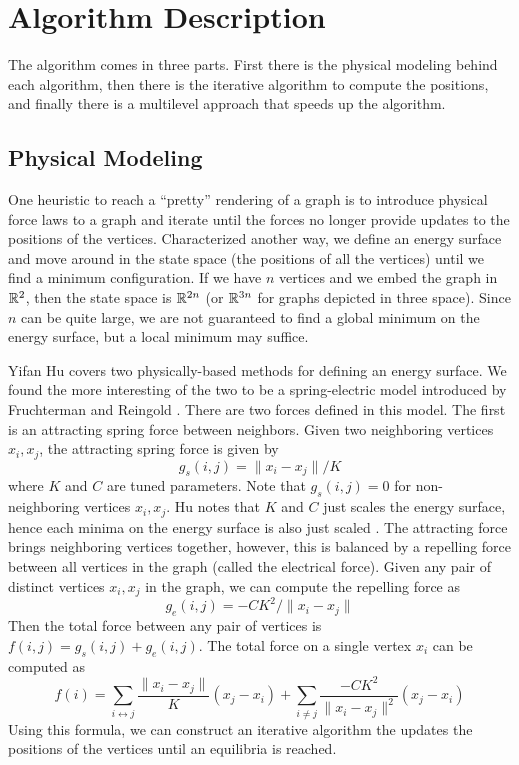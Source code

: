 \section{Algorithm Description}

The algorithm comes in three parts.
First there is the physical modeling behind each algorithm, then there is the iterative algorithm to compute the positions, and finally there is a multilevel approach that speeds up the algorithm.

\subsection{Physical Modeling}


One heuristic to reach a ``pretty'' rendering of a graph is to introduce physical force laws to a graph and iterate until the forces no longer provide updates to the positions of the vertices.
Characterized another way, we define an energy surface and move around in the state space (the positions of all the vertices) until we find a minimum configuration.
If we have $n$ vertices and we embed the graph in ${\mathbb R} ^2$, then the state space is ${\mathbb R} ^{2n}$ (or ${\mathbb R} ^{3n}$ for graphs depicted in three space).
Since $n$ can be quite large, we are not guaranteed to find a global minimum on the energy surface, but a local minimum may suffice.

Yifan Hu covers two physically-based methods for defining an energy surface.
We found the more interesting of the two to be a spring-electric model introduced by Fruchterman and Reingold \cite{fruchterman1991graph}.
There are two forces defined in this model.
The first is an attracting spring force between neighbors.
Given two neighboring vertices $x_i, x_j$, the attracting spring force is given by
$$ g_s (i,j) = \| x_i - x_j \| / K $$
where $K$ and $C$ are tuned parameters.
Note that $g_s (i,j) = 0$ for non-neighboring vertices $x_i, x_j$.
Hu notes that $K$ and $C$ just scales the energy surface, hence each minima on the energy surface is also just scaled \cite{hu2005efficient}.
The attracting force brings neighboring vertices together, however, this is balanced by a repelling force between all vertices in the graph (called the electrical force).
Given any pair of distinct vertices $x_i, x_j$ in the graph, we can compute the repelling force as
$$ g_e (i,j) = -C K^2 / \| x_i - x_j \| $$
Then the total force between any pair of vertices is $f (i,j) = g_s(i,j) + g_e (i,j)$.
The total force on a single vertex $x_i$ can be computed as
$$ f(i) = \sum _{i \leftrightarrow j} \dfrac{\| x_i - x_j \|}{K} (x_j - x_i) + \sum _{i \neq j} \dfrac{-CK^2}{\| x_i - x_j \|^2} (x_j - x_i) $$
Using this formula, we can construct an iterative algorithm the updates the positions of the vertices until an equilibria is reached.

